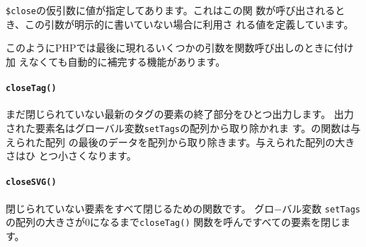 \begin{itemize}
\begin{itemize}
\texttt{\$close}の仮引数に値が指定してあります。これはこの関
       数が呼び出されるとき、この引数が明示的に書いていない場合に利用さ
       れる値を定義しています。

このようにPHPでは最後に現れるいくつかの引数を関数呼び出しのときに付け加
       えなくても自動的に補完する機能があります。

 \end{itemize}       
\paragraph{\texttt{closeTag()}}
       まだ閉じられていない最新のタグの要素の終了部分をひとつ出力します。
       出力
       された要素名はグローバル変数\texttt{setTags}の配列から取り除かれま
       す。の関数は与えられた配列
       の最後のデータを配列から取り除きます。与えられた配列の大きさはひ
       とつ小さくなります。
 \paragraph{\texttt{closeSVG()}}
       閉じられていない要素をすべて閉じるための関数です。
       グロ−バル変数
       \texttt{setTags}の配列の大きさが$0$になるまで\texttt{closeTag()}
       関数を呼んですべての要素を閉じます。



\end{itemize}
